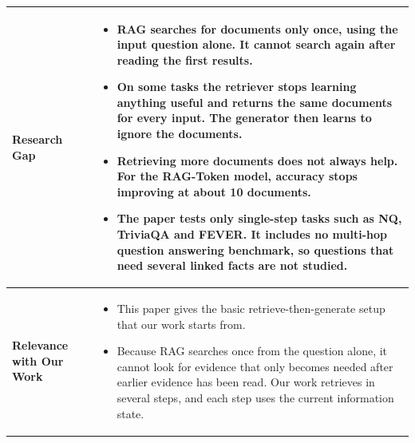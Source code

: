 \documentclass[12pt,a4paper]{report}
\begin{document}
\begin{longtable}{|p{1.25in}|p{5.15in}|}
\textbf{Research Gap} &
\begin{itemize}[leftmargin=0.18in,itemsep=0.05in,topsep=0pt,parsep=0pt]
\item RAG searches for documents only once, using the input question alone. It cannot search again after reading the first results. %
\item On some tasks the retriever stops learning anything useful and returns the same documents for every input. The generator then learns to ignore the documents. %
\item Retrieving more documents does not always help. For the RAG-Token model, accuracy stops improving at about 10 documents. %
\item The paper tests only single-step tasks such as NQ, TriviaQA and FEVER. It includes no multi-hop question answering benchmark, so questions that need several linked facts are not studied. %
\end{itemize} \\ \hline

\textbf{Relevance with Our Work} &
\begin{itemize}[leftmargin=0.18in,itemsep=0.05in,topsep=0pt,parsep=0pt]
\item This paper gives the basic retrieve-then-generate setup that our work starts from.
\item Because RAG searches once from the question alone, it cannot look for evidence that only becomes needed after earlier evidence has been read. Our work retrieves in several steps, and each step uses the current information state.
\end{itemize} \\ \hline
\end{longtable}
\clearpage
\end{document}
